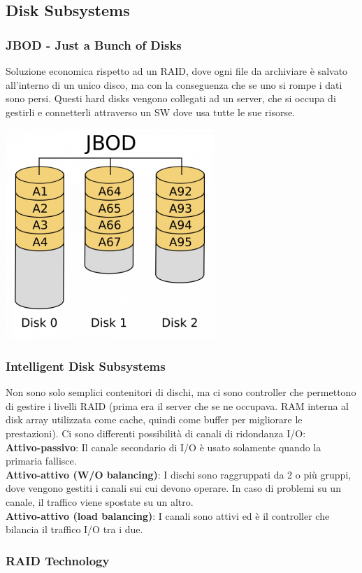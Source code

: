 \documentclass[8pt,a4paper]{extarticle}
\begin{document}
\begin{multicols*}{4}
\subsection{Disk Subsystems}
\subsubsection{JBOD - Just a Bunch of Disks}
Soluzione economica rispetto ad un RAID, dove ogni file da archiviare è salvato all’interno di un unico disco, ma con la conseguenza che se uno si rompe i dati sono persi. Questi hard disks vengono collegati ad un server, che si occupa di gestirli e connetterli attraverso un SW dove usa tutte le sue risorse. 
\begin{center}
    \includegraphics[width=.4\linewidth]{src/JBOD.png}
  \end{center}

\subsubsection{Intelligent Disk Subsystems}
Non sono solo semplici contenitori di dischi, ma ci sono controller che permettono di gestire i livelli RAID (prima era il server che se ne occupava. RAM interna al disk array utilizzata come cache, quindi come buffer per migliorare le prestazioni).
Ci sono differenti possibilità di canali di ridondanza I/O:\\
\textbf{Attivo-passivo}: Il canale secondario di I/O è usato solamente quando la primaria fallisce.\\
\textbf{Attivo-attivo (W/O balancing)}: I dischi sono raggruppati da 2 o più gruppi, dove vengono gestiti i canali sui cui devono operare. In caso di problemi su un canale, il traffico viene spostate su un altro.\\
\textbf{Attivo-attivo (load balancing)}: I canali sono attivi ed è il controller che bilancia il traffico I/O tra i due.
\subsubsection{RAID Technology}


\end{multicols*}
\end{document}
